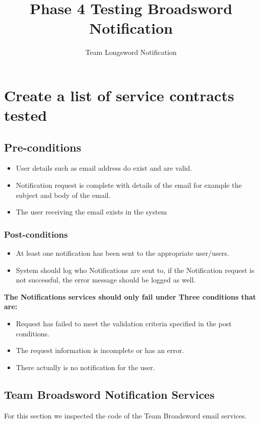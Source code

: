 \documentclass[11pt]{article}
\author{Team Longsword Notification}
\title{Phase 4 Testing Broadsword Notification}
\begin{document}
	\setlength{\parskip}{6pt}
	
	
	
	\tableofcontents
	
	\newpage
	
	
	\section{Create a list of service contracts tested}
	\subsection{Pre-conditions}
	\begin{itemize}
		\item User details such as email address do exist and are valid.
		\item Notification request is complete with details of the email for example the subject and body of the email.
		\item The user receiving the email exists in the system
	\end{itemize}
	\subsubsection{Post-conditions}
	\begin{itemize}
		\item At least one notification has been sent to the appropriate user/users.
		\item System should log who Notifications are sent to, if the Notification request is not successful, the error message should be logged as well.
	\end{itemize}
	\textbf{The Notifications services should only fail under Three conditions that are:}
	\begin{itemize}
		\item Request has failed to meet the validation criteria specified in the post conditions.
		\item The request information is incomplete or has an error.
		\item There actually is no notification for the user.
	\end{itemize}
	\subsection{Team Broadsword Notification Services}
	For this section we inspected the code of the Team Broadsword email services.
\end{document}
